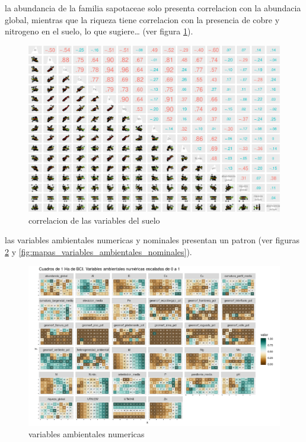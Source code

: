 \documentclass[11pt,]{article}
\begin{document}
la abundancia de la familia sapotaceae solo presenta correlacion con la
abundacia global, mientras que la riqueza tiene correlacion con la
presencia de cobre y nitrogeno en el suelo, lo que sugiere\ldots{} (ver
figura \ref{fig:p_cor_suelo_ar}).

\begin{figure}
\centering
\includegraphics{manuscrito_files/figure-latex/unnamed-chunk-5-1.pdf}
\caption{\label{fig:p_cor_suelo_ar}correlacion de las variables del
suelo}
\end{figure}

las variables ambientales numericas y nominales presentan un patron (ver
figuras \ref{fig:mapas_variables_ambientales_numericas} y
\ref{fig:mapas_variables_ambientales_nominales}).

\begin{figure}
\centering
\includegraphics[width=1.00000\textwidth]{mapas_variables_ambientales_numericas.png}
\caption{variables ambientales
numericas\label{fig:mapas_variables_ambientales_numericas}}
\end{figure}
\end{document}
